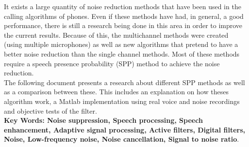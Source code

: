 It exists a large quantity of noise reduction methods that have been used in the calling algorithms of phones. Even if these methods have had, in general, a good performance, there is still a research being done in this area in order to improve the current results. Because of this, the multichannel methods were created (using multiple microphones) as well as new algorithms that pretend to have a better noise reduction than the single channel methods. Most of these methods require a speech presence probability (SPP) method to achieve the noise reduction.\\

The following document presents a research about different SPP methods as well as a comparison between these. This includes an explanation on how theses algorithm work, a Matlab implementation using real voice and noise recordings and objective tests of the filter. \\



\textbf{\small Key Words: Noise suppression, Speech processing, Speech enhancement, Adaptive signal processing, Active filters, Digital filters, Noise, Low-frequency noise, Noise cancellation, Signal to noise ratio}.\\


